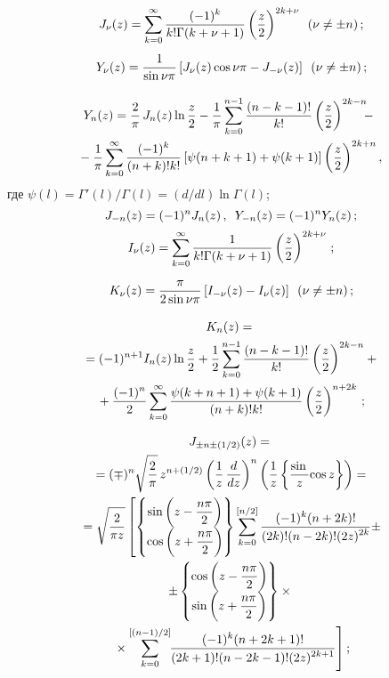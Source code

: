 \begin{multicols}{2}
{    $$
    J_\nu (z) = \sss_{k=0}^\infty \fr{(-1)^k}{k! \Gamma(k+\nu+1)} 
    \left( \fr{z}{2}\right)^{2k+\nu} \enskip (\nu \ne \pm n)\,;
    $$
    $$
    Y_\nu (z) =  \fr{1}{\sin \nu \pi} \lk J_\nu (z) \cos \nu \pi - J_{-\nu} (z)\rk 
    \enskip ( \nu \ne \pm n)\,;
    $$
   
   \vspace*{-12pt}
   
   \noindent
   \begin{multline*}
    \!Y_n (z) = \fr{2}{\pi}\, J_n(z) \ln \fr{z}{2} - 
    \fr{1}{\pi} \sss_{k=0}^{n-1} \fr{(n-k-1)!}{k!} \left( \fr{z}{2}\right)^{2k-n}\!\!\! -{}\\
\!{}-\fr{1}{\pi} \sss_{k=0}^\infty \fr{(-1)^k}{(n+k)!k!} \lk \psi(n+k+1) + 
\psi(k+1) \rk \left( \fr{z}{2}\right)^{2k+n},
\end{multline*}
где $\psi(l) = \Gamma'(l)/\Gamma (l) = (d/dl) \ln \Gamma(l)$;
    $$
    J_{-n} (z) = (-1)^n J_n (z)\,,\enskip Y_{-n} (z) = (-1)^n Y_n (z)\,;
    $$
    $$
    I_\nu (z) = \sss_{k=0}^\infty \fr{1}{k! \Gamma (k+\nu+1)} 
    \left(\fr{z}{2}\right)^{2k+\nu}\,;
    $$
    $$
    K_\nu (z) = \fr{\pi}{2 \sin \nu \pi} \lk I_{-\nu} (z) -
     I_\nu (z)\rk \enskip (\nu \ne \pm n)\,;
     $$

\vspace*{-10pt}

\noindent
\begin{multline*}
    K_n(z) ={}\\
    {}=(-1)^{n+1} I_n (z) \ln \fr{z}{2} + \fr{1}{2} 
    \sss_{k=0}^{n-1} \fr{(n-k-1)!}{k!} \left( \fr{z}{2}\right)^{2k-n} +{}\\
    {}+\fr{(-1)^n}{2} \sss_{k=0}^\infty \fr{\psi(k+n+1) + \psi(k+1)}{(n+k)! k!} 
    \left( \fr{z}{2}\right)^{n+2k}\,;
    \end{multline*}
    
    
    \noindent
    \begin{multline*}
J_{\pm n\pm (1/2)} (z) ={}\\
{}=(\mp)^n \sqrt{\fr{2}{\pi}}\, z^{n+(1/2)} \left( 
\fr{1}{z} \,\fr{d}{dz}\right)^n \left(\fr{1}{z} \lf{
\fr\sin z}{\cos z}\rf\right)={}\\
{}=\sqrt{\fr{2}{\pi z}} \left[  \lf \begin{matrix}
    \sin \left(z- \fr{n\pi}{2}\right)\\
    \cos \left(z+ \fr{n\pi}{2}\right)\end{matrix}\rf 
    \sss_{k=0}^{\lk n/2\rk} \fr{(-1)^k (n+2k)!}{(2k)! (n-2k)! (2z)^{2k}} \pm  \right.\\
\left. \pm \lf \begin{matrix}
    \cos \left(z- \fr{n\pi}{2}\right)\\
    \sin \left(z+ \fr{n\pi}{2}\right)\end{matrix}\rf \times{}\right.\\
\left.{}\times \sss_{k=0}^{\lk (n-1)/2\rk} \hspace*{-1mm}
    \fr{(-1)^k (n+2k+1)!}{(2k+1)! (n-2k-1)! (2z)^{2k+1}}\right];
    \end{multline*}

}
\end{multicols}
